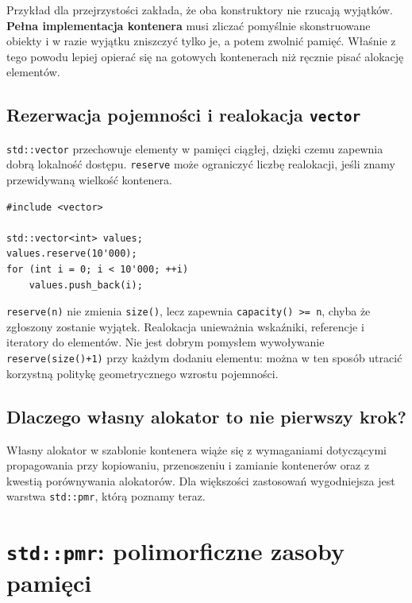 Przykład dla przejrzystości zakłada, że oba konstruktory nie rzucają
wyjątków. \textbf{Pełna implementacja kontenera} musi zliczać
pomyślnie skonstruowane obiekty i w razie wyjątku zniszczyć tylko je,
a potem zwolnić pamięć. Właśnie z tego powodu lepiej opierać się na
gotowych kontenerach niż ręcznie pisać alokację elementów.

\subsection{Rezerwacja pojemności i realokacja \texttt{vector}}

\texttt{std::vector} przechowuje elementy w pamięci ciągłej, dzięki
czemu zapewnia dobrą lokalność dostępu. \texttt{reserve} może
ograniczyć liczbę realokacji, jeśli znamy przewidywaną wielkość
kontenera.

\begin{lstlisting}
#include <vector>

std::vector<int> values;
values.reserve(10'000);
for (int i = 0; i < 10'000; ++i)
    values.push_back(i);
\end{lstlisting}

\texttt{reserve(n)} nie zmienia \texttt{size()}, lecz zapewnia
\texttt{capacity() >= n}, chyba że zgłoszony zostanie wyjątek.
Realokacja unieważnia wskaźniki, referencje i iteratory do elementów.
Nie jest dobrym pomysłem wywoływanie \texttt{reserve(size()+1)}
przy każdym dodaniu elementu: można w ten sposób utracić
korzystną politykę geometrycznego wzrostu pojemności.

\subsection{Dlaczego własny alokator to nie pierwszy krok?}

Własny alokator w szablonie kontenera wiąże się z wymaganiami
dotyczącymi propagowania przy kopiowaniu, przenoszeniu i zamianie
kontenerów oraz z kwestią porównywania alokatorów.
Dla większości zastosowań wygodniejsza jest warstwa
\texttt{std::pmr}, którą poznamy teraz.

\section{\texttt{std::pmr}: polimorficzne zasoby pamięci}

